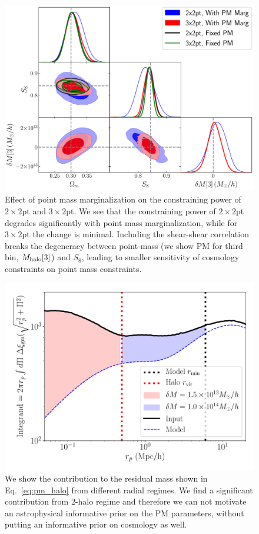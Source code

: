 \documentclass[aps, prd,twocolumn,superscriptaddress,nofootinbib,preprintnumbers]{revtex4-1}
\begin{document}
\begin{figure}
\includegraphics[width=\columnwidth]{figs/PM_constraints_2x2pt_3x2pt.pdf}
\caption[]{Effect of point mass marginalization on the constraining power of $2\times2$pt and $3\times2$pt. We see that the constraining power of $2\times2$pt degrades significantly with point mass marginalization, while for $3\times2$pt the change is minimal. Including the shear-shear correlation  breaks the degeneracy between point-mass (we show PM for third bin, $M_{\rm halo}[3]$) and $S_8$, leading to smaller sensitivity of cosmology constraints on point mass constraints. }
\label{fig:pm_effect}
\end{figure}


\begin{figure}
\includegraphics[width=\columnwidth]{figs/PM_contribution_radial.pdf}
\caption[]{We show the contribution to the residual mass shown in Eq.~\ref{eq:pm_halo} from different radial regimes. We find a significant contribution from 2-halo regime and therefore we can not motivate an astrophysical informative prior on the PM parameters, without putting an informative prior on cosmology as well.  
}
\label{fig:pm_prior}
\end{figure}
\end{document}
